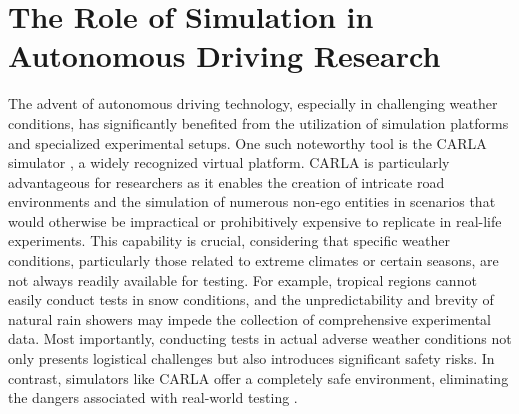 \documentclass[report.tex]{subfiles}
\begin{document}
    \section{The Role of Simulation in Autonomous Driving Research}



    The advent of autonomous driving technology, especially in challenging weather conditions, has significantly benefited from the utilization of simulation platforms and specialized experimental setups. One such noteworthy tool is the CARLA simulator \cite{dosovitskiy2017carla}, a widely recognized virtual platform. CARLA is particularly advantageous for researchers as it enables the creation of intricate road environments and the simulation of numerous non-ego entities in scenarios that would otherwise be impractical or prohibitively expensive to replicate in real-life experiments. This capability is crucial, considering that specific weather conditions, particularly those related to extreme climates or certain seasons, are not always readily available for testing. For example, tropical regions cannot easily conduct tests in snow conditions, and the unpredictability and brevity of natural rain showers may impede the collection of comprehensive experimental data. Most importantly, conducting tests in actual adverse weather conditions not only presents logistical challenges but also introduces significant safety risks. In contrast, simulators like CARLA offer a completely safe environment, eliminating the dangers associated with real-world testing \cite{zhang2023perception}.
\end{document}
